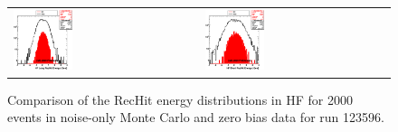 \begin{figure}[h!]
 \centering
 \begin{tabular}{ll}
  \includegraphics[width=0.33\textwidth]{plots_CaloNoise/h_RecHitEinHFl.eps} &
  \includegraphics[width=0.33\textwidth]{plots_CaloNoise/h_RecHitEinHFs.eps} \\
 \end{tabular}
 \caption{\small Comparison of the RecHit energy distributions in HF for 2000 events in noise-only Monte Carlo
          and zero bias data for run 123596.\label{fig:RecHitE_HCAL_2}}
\end{figure}